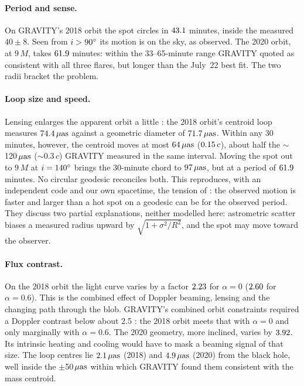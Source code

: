 \paragraph{Period and sense.} On GRAVITY's 2018 orbit the spot circles
\sgra{} in $43.1$ minutes, inside the measured $40\pm8$. Seen from
$i > 90^\circ$ its motion is \XFlGraSense{} on the sky, as observed. The 2020
orbit, at $9\,M$, takes $61.9$ minutes: within the 33--65-minute
range GRAVITY quoted as consistent with all three flares, but longer than the
July~22 best fit. The two radii bracket the problem.

\paragraph{Loop size and speed.} Lensing enlarges the apparent orbit a little
\citep[as GRAVITY's models also show;][]{Gravity2018flares}: the 2018 orbit's
centroid loop measures $74.4\,\mu\mathrm{as}$ against a geometric diameter of
$71.7\,\mu\mathrm{as}$. Within any 30 minutes, however, the centroid moves at
most $64\,\mu\mathrm{as}$ ($0.15\,c$), about half the
$\sim$120\,$\mu\mathrm{as}$ ($\sim$0.3\,$c$) GRAVITY measured in the same interval.
Moving the spot out to $9\,M$ at $i = 140^\circ$ brings the 30-minute chord to
$97\,\mu\mathrm{as}$, but at a period of $61.9$ minutes. No circular
geodesic reconciles both. This reproduces, with an independent code and our
own spacetime, the tension of \citet{Gravity2020flares}: the observed motion
is faster and larger than a hot spot on a geodesic can be for the observed
period. They discuss two partial explanations, neither modelled here:
astrometric scatter biases a measured radius upward by
$\sqrt{1 + \sigma^2/R^2}$, and the spot may move toward the observer.

\paragraph{Flux contrast.} On the 2018 orbit the light curve varies by a
factor $2.23$ for $\alpha = 0$ ($2.60$ for $\alpha =
0.6$). This is the combined effect of Doppler beaming, lensing and the
changing path through the blob. GRAVITY's combined orbit constraints required
a Doppler contrast below about 2.5 \citep[their Fig.~B.3]{Gravity2018flares}:
the 2018 orbit meets that with $\alpha = 0$ and only marginally with
$\alpha = 0.6$. The 2020 geometry, more inclined, varies by
$3.92$. Its intrinsic heating and cooling would have to mask a
beaming signal of that size. The loop centres lie $2.1\,\mu\mathrm{as}$ (2018)
and $4.9\,\mu\mathrm{as}$ (2020) from the black hole, well inside the
$\pm$50\,$\mu\mathrm{as}$ within which GRAVITY found them consistent with the mass
centroid.

